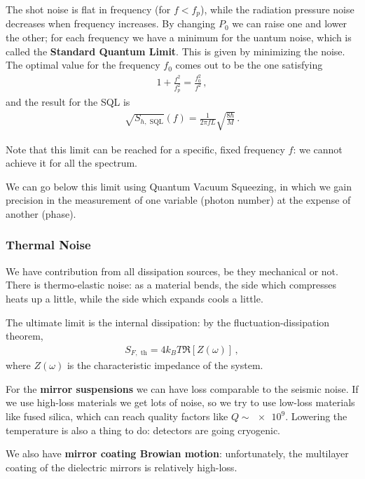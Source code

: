 \documentclass[main.tex]{subfiles}
\begin{document}
The shot noise is flat in frequency (for \(f < f_p\)), while the radiation pressure noise decreases when frequency increases. By changing \(P_0 \) we can raise one and lower the other; for each frequency we have a minimum for the uantum noise, which is called the \textbf{Standard Quantum Limit}. This is given by minimizing the noise. 
The optimal value for the frequency \(f_0 \) comes out to be the one satisfying 
%
\begin{align}
1 + \frac{f^2}{f_p^2} = \frac{f_0^2}{f^2}
\,,
\end{align}
%
and the result for the SQL is 
%
\begin{align}
\sqrt{S_{h, \text{ SQL}}} (f) = \frac{1}{2 \pi f L} \sqrt{\frac{8 \hbar}{M}}
\,.
\end{align}

Note that this limit can be reached for a specific, fixed frequency \(f\): we cannot achieve it for all the spectrum.

We can go below this limit using Quantum Vacuum Squeezing, in which we gain precision in the measurement of one variable (photon number) at the expense of another (phase). 

\subsubsection{Thermal Noise}

We have contribution from all dissipation sources, be they mechanical or not. 
There is thermo-elastic noise: as a material bends, the side which compresses heats up a little, while the side which expands cools a little. 

The ultimate limit is the internal dissipation: by the fluctuation-dissipation theorem,
%
\begin{align}
S_{F, \text{ th}} = 4 k_B T \Re[Z(\omega )]  
\,,
\end{align}
%
where \(Z(\omega )\) is the characteristic impedance of the system. 

For the \textbf{mirror suspensions} we can have loss comparable to the seismic noise. If we use high-loss materials we get lots of noise, so we try to use low-loss materials like fused silica, which can reach quality factors like \(Q \sim \num{e9}\). 
Lowering the temperature is also a thing to do: detectors are going cryogenic. 

We also have \textbf{mirror coating Browian motion}: unfortunately, the multilayer coating of the dielectric mirrors is relatively high-loss. 
\end{document}
